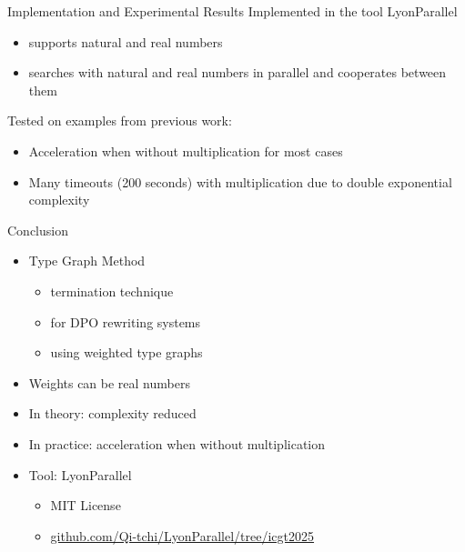 \documentclass{beamer}
\begin{document}
\begin{frame}{Implementation and Experimental Results}
  \alert{Implemented} in the tool LyonParallel
        \begin{itemize}
          \item supports natural and real numbers
          \item searches with natural and real numbers in parallel and cooperates between them
        \end{itemize}

  \alert{Tested} on examples from previous work:
  \begin{itemize}
    \item \alert{Acceleration} when without multiplication for most cases
    \item Many \alert{timeouts} (200 seconds) with multiplication due to double exponential complexity
  \end{itemize}
\end{frame}

\begin{frame}{Conclusion}
  \begin{itemize}
    \item Type Graph Method 
         \begin{itemize}
          \item termination technique
          \item for DPO rewriting systems
          \item using weighted type graphs 
         \end{itemize}
    \item Weights can be real numbers
    \item In theory: complexity reduced
    \item In practice: acceleration when without multiplication
    \item Tool: LyonParallel
        \begin{itemize}
          \item MIT License
          \item \url{github.com/Qi-tchi/LyonParallel/tree/icgt2025}
        \end{itemize}
  \end{itemize}
\end{frame} 
\end{document}
